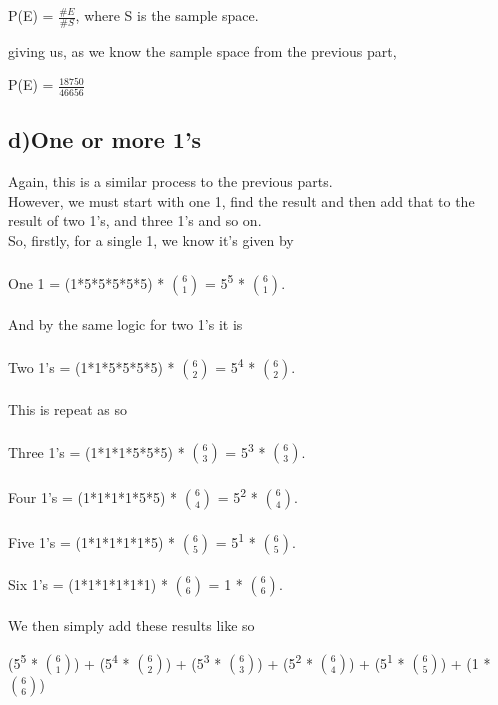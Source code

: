 \documentclass{report}
\begin{document}
			\begin{center}
				P(E) = $\frac{\#E}{\#S}$, where S is the sample space.
			\end{center}

			giving us, as we know the sample space from the previous part,

			\begin{center}
				P(E) = $\frac{18750}{46656}$
			\end{center}


		
		\subsection*{d)One or more 1’s}
		Again, this is a similar process to the previous parts.\\
		However, we must start with one 1, find the result and then add that to the result of two 1's, and three 1's and so on.\\
		So, firstly, for a single 1, we know it's given by\\\\
		One 1 = (1*5*5*5*5*5) * ${6 \choose 1}$ = 5\textsuperscript{5} * ${6 \choose 1}$.\\\\
		And by the same logic for two 1's it is\\\\
		Two 1's = (1*1*5*5*5*5) * ${6 \choose 2}$ = 5\textsuperscript{4} * ${6 \choose 2}$.\\\\
		This is repeat as so\\\\
		Three 1's = (1*1*1*5*5*5) * ${6 \choose 3}$ = 5\textsuperscript{3} * ${6 \choose 3}$.\\\\
		Four 1's = (1*1*1*1*5*5) * ${6 \choose 4}$ = 5\textsuperscript{2} * ${6 \choose 4}$.\\\\
		Five 1's = (1*1*1*1*1*5) * ${6 \choose 5}$ = 5\textsuperscript{1} * ${6 \choose 5}$.\\\\
		Six 1's = (1*1*1*1*1*1) * ${6 \choose 6}$ = 1 * ${6 \choose 6}$.\\\\
		We then simply add these results like so

		\begin{center}
			(5\textsuperscript{5} * ${6 \choose 1}$) + (5\textsuperscript{4} * ${6 \choose 2}$) + (5\textsuperscript{3} * ${6 \choose 3}$) + (5\textsuperscript{2} * ${6 \choose 4}$) + 
			(5\textsuperscript{1} * ${6 \choose 5}$) + (1 * ${6 \choose 6}$)
		\end{center}
\end{document}
